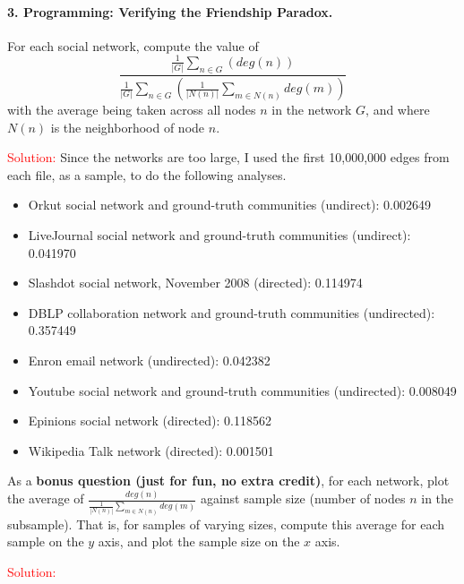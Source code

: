 \documentclass[11pt]{article} %
\begin{document}
 

\paragraph{3. Programming: Verifying the Friendship Paradox.}   

For each social network, compute the value of
$$\frac{\frac{1}{|G|}\sum\limits_{n \in G}(deg(n))}{\frac{1}{|G|}\sum\limits_{n\in G}(\frac{1}{|N(n)|}\sum\limits_{m \in N(n)} deg(m))}$$
with the average being taken across all nodes $n$ in the network $G$, and where $N(n)$ is the neighborhood of node $n$.


\textcolor{red}{Solution:} 
Since the networks are too large, I used the first 10,000,000 edges from each file, as a sample, to do the following analyses. 

\begin{itemize}
	\item{Orkut social network and ground-truth communities (undirect): }  0.002649  
	\item{ LiveJournal social network and ground-truth communities (undirect): } 0.041970 
	\item{ Slashdot social network, November 2008 (directed): } 0.114974  
	\item{DBLP collaboration network and ground-truth communities (undirected): } 0.357449 
	\item{ Enron email network (undirected): } 0.042382  
	\item{Youtube social network and ground-truth communities (undirected): } 0.008049 
	\item{Epinions social network (directed): } 0.118562  
	\item{Wikipedia Talk network (directed): } 0.001501  
	 


\end{itemize}

As a \textbf{bonus question (just for fun, no extra credit)}, for each network, plot the average of $\frac{deg(n)}{\frac{1}{|N(n)|}\sum\limits_{m \in N(n)} deg(m)}$ against sample size (number of nodes $n$ in the subsample). That is, for samples of varying sizes, compute this average for each sample on the $y$ axis, and plot the sample size on the $x$ axis.

\textcolor{red}{Solution:} 
\end{document}
